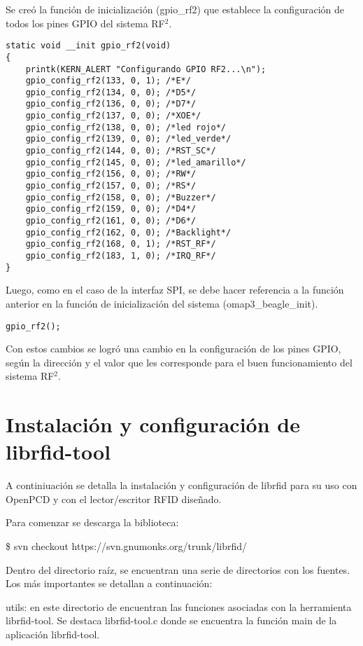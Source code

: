 Se creó la función de inicialización (gpio\_rf2) que establece la configuración de todos los pines GPIO del sistema RF$^{2}$.

\begin{verbatim}
static void __init gpio_rf2(void)
{
    printk(KERN_ALERT "Configurando GPIO RF2...\n");
    gpio_config_rf2(133, 0, 1); /*E*/
    gpio_config_rf2(134, 0, 0); /*D5*/
    gpio_config_rf2(136, 0, 0); /*D7*/
    gpio_config_rf2(137, 0, 0); /*XOE*/
    gpio_config_rf2(138, 0, 0); /*led rojo*/
    gpio_config_rf2(139, 0, 0); /*led_verde*/
    gpio_config_rf2(144, 0, 0); /*RST_SC*/
    gpio_config_rf2(145, 0, 0); /*led_amarillo*/
    gpio_config_rf2(156, 0, 0); /*RW*/
    gpio_config_rf2(157, 0, 0); /*RS*/
    gpio_config_rf2(158, 0, 0); /*Buzzer*/
    gpio_config_rf2(159, 0, 0); /*D4*/
    gpio_config_rf2(161, 0, 0); /*D6*/
    gpio_config_rf2(162, 0, 0); /*Backlight*/
    gpio_config_rf2(168, 0, 1); /*RST_RF*/
    gpio_config_rf2(183, 1, 0); /*IRQ_RF*/
}
\end{verbatim}

Luego, como en el caso de la interfaz SPI, se debe hacer referencia a la función anterior en la función de inicialización del sistema (omap3\_beagle\_init).

\begin{verbatim}
gpio_rf2();
\end{verbatim}

Con estos cambios se logró una cambio en la configuración de los pines GPIO, según la dirección y el valor que les corresponde para el buen funcionamiento del sistema RF$^{2}$.


\section{Instalación y configuración de librfid-tool}\label{ins_conf_librfid}

A continiuación se detalla la instalación y configuración de librfid para su uso con OpenPCD y con el lector/escritor RFID diseñado.

Para comenzar se descarga la biblioteca:

\bigskip
\centerline{\$ svn checkout https://svn.gnumonks.org/trunk/librfid/}

\bigskip
Dentro del directorio raíz, se encuentran una serie de directorios con los fuentes. Los más importantes se detallan a continuación:

\bigskip
utils: en este directorio de encuentran las funciones asociadas con la herramienta librfid-tool. Se destaca librfid-tool.c donde se encuentra la función main de la aplicación librfid-tool.

